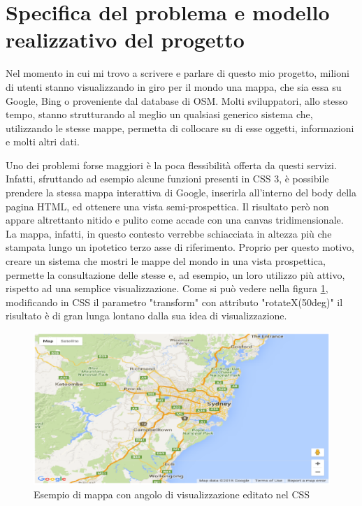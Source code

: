 \section{Specifica del problema e modello realizzativo del progetto}
Nel momento in cui mi trovo a scrivere e parlare di questo mio progetto, milioni di utenti stanno visualizzando in giro per il mondo una mappa, che sia essa su Google, Bing o proveniente dal database di OSM. Molti sviluppatori, allo stesso tempo, stanno strutturando al meglio un qualsiasi generico sistema che, utilizzando le stesse mappe, permetta di collocare su di esse oggetti, informazioni e molti altri dati.

Uno dei problemi forse maggiori è la poca flessibilità offerta da questi servizi. Infatti, sfruttando ad esempio alcune funzioni presenti in CSS 3, è possibile prendere la stessa mappa interattiva di Google, inserirla all'interno del body della pagina HTML, ed ottenere una vista semi-prospettica. Il risultato però non appare altrettanto nitido e pulito come accade con una canvas tridimensionale. La mappa, infatti, in questo contesto verrebbe schiacciata in altezza più che stampata lungo un ipotetico terzo asse di riferimento. Proprio per questo motivo, creare un sistema che mostri le mappe del mondo in una vista prospettica, permette la consultazione delle stesse e, ad esempio, un loro utilizzo più attivo, rispetto ad una semplice visualizzazione. Come si può vedere nella figura \ref{fig:rotationcss}, modificando in CSS il parametro "transform" con attributo "rotateX(50deg)" il risultato è di gran lunga lontano dalla sua idea di visualizzazione.

\begin{figure}[H]
	\centering
	\includegraphics[scale=0.5]{figure/rotationcss.eps}
	\caption{Esempio di mappa con angolo di visualizzazione editato nel CSS}\label{fig:rotationcss}
\end{figure}

